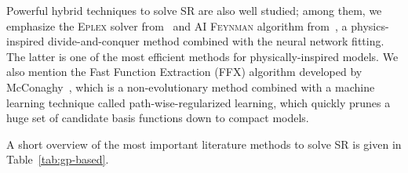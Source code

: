 \documentclass[a4paper,12pt]{elsarticle}
\begin{document}
    Powerful hybrid techniques to solve SR are also well studied; among them, we emphasize the \textsc{Eplex} solver from~\cite{la2019probabilistic,la2016epsilon} and \textsc{AI Feynman} algorithm from~\cite{udrescu2020ai}, a physics-inspired divide-and-conquer method combined with the neural network fitting. The latter is one of the most efficient methods for physically-inspired models. We also mention the Fast Function Extraction (\textsc{FFX}) algorithm developed by McConaghy~\cite{mcconaghy2011ffx}, which is a non-evolutionary method combined with a machine learning technique called path-wise-regularized learning, which quickly prunes a huge set of candidate basis functions down to compact models.
	
	A short overview of the most important literature methods to solve SR is given in Table~\ref{tab:gp-based}.  
	
\end{document}
